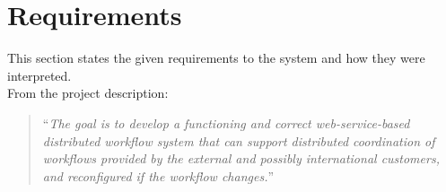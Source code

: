 \section{Requirements}
This section states the given requirements to the system and how they were interpreted.\\

From the project description:
\begin{quote}
“\textit{The goal is to develop a functioning and correct web-service-based distributed workflow system that can support distributed coordination of workflows provided by the external and possibly international customers, and reconfigured if the workflow changes.}”
\end{quote}




